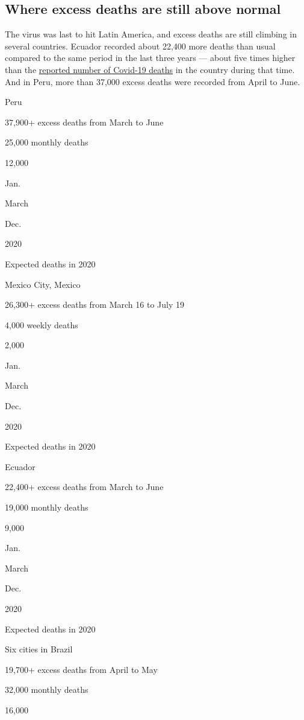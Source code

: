 \hypertarget{where-excess-deaths-are-still-above-normal}{%
\subsection{Where excess deaths are still above
normal}\label{where-excess-deaths-are-still-above-normal}}

The virus was last to hit Latin America, and excess deaths are still
climbing in several countries. Ecuador recorded about 22,400 more deaths
than usual compared to the same period in the last three years --- about
five times higher than the
\href{https://www.nytimes3xbfgragh.onion/2020/04/23/world/americas/ecuador-deaths-coronavirus.html}{reported
number of Covid-19 deaths} in the country during that time. And in Peru,
more than 37,000 excess deaths were recorded from April to June.

Peru

37,900+ excess deaths from March to June

25,000 monthly deaths

12,000

Jan.

March

Dec.

2020

Expected deaths in 2020

Mexico City, Mexico

26,300+ excess deaths from March 16 to July 19

4,000 weekly deaths

2,000

Jan.

March

Dec.

2020

Expected deaths in 2020

Ecuador

22,400+ excess deaths from March to June

19,000 monthly deaths

9,000

Jan.

March

Dec.

2020

Expected deaths in 2020

Six cities in Brazil

19,700+ excess deaths from April to May

32,000 monthly deaths

16,000

